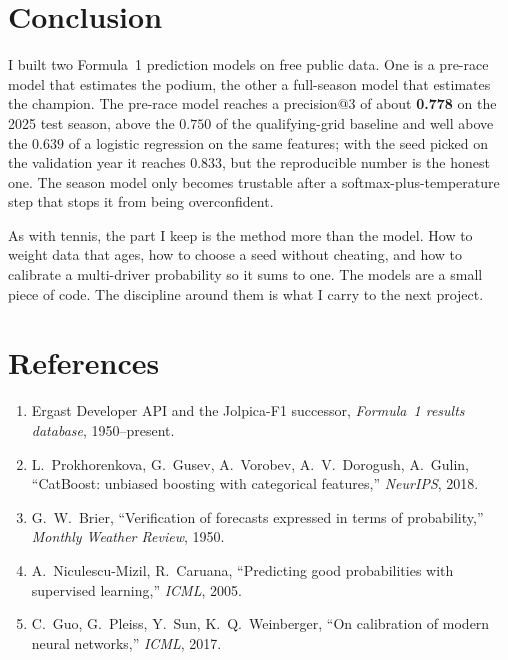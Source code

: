 \documentclass[10pt,twocolumn]{article}
\begin{document}
\section{Conclusion}
I built two Formula~1 prediction models on free public data. One is a pre-race
model that estimates the podium, the other a full-season model that estimates
the champion. The pre-race model reaches a precision@3 of about \textbf{0.778}
on the 2025 test season, above the \(0.750\) of the qualifying-grid baseline and
well above the \(0.639\) of a logistic regression on the same features; with the
seed picked on the validation year it reaches 0.833, but the reproducible number
is the honest one. The season model only becomes trustable after a
softmax-plus-temperature step that stops it from being overconfident.

As with tennis, the part I keep is the method more than the model. How to weight
data that ages, how to choose a seed without cheating, and how to calibrate a
multi-driver probability so it sums to one. The models are a small piece of
code. The discipline around them is what I carry to the next project.

\section{References}
\begin{enumerate}[leftmargin=1.6em,itemsep=1pt]
  \item Ergast Developer API and the Jolpica-F1 successor, \textit{Formula~1
        results database}, 1950--present.
  \item L.~Prokhorenkova, G.~Gusev, A.~Vorobev, A.~V.~Dorogush, A.~Gulin,
        ``CatBoost: unbiased boosting with categorical features,''
        \textit{NeurIPS}, 2018.
  \item G.~W.~Brier, ``Verification of forecasts expressed in terms of
        probability,'' \textit{Monthly Weather Review}, 1950.
  \item A.~Niculescu-Mizil, R.~Caruana, ``Predicting good probabilities with
        supervised learning,'' \textit{ICML}, 2005.
  \item C.~Guo, G.~Pleiss, Y.~Sun, K.~Q.~Weinberger, ``On calibration of modern
        neural networks,'' \textit{ICML}, 2017.
\end{enumerate}
\end{document}
